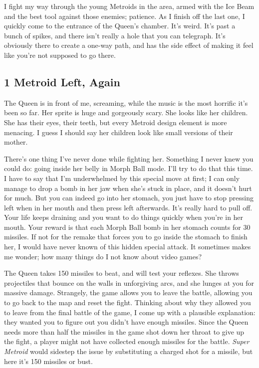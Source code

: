 \documentclass{book}
\begin{document}
I fight my way through the young Metroids in the area, armed with the Ice Beam and the best tool against those enemies; patience. As I finish off the last one, I quickly come to the entrance of the Queen’s chamber. It’s weird. It’s past a bunch of spikes, and there isn’t really a hole that you can telegraph. It’s obviously there to create a one-way path, and has the side effect of making it feel like you’re not supposed to go there.

\subsection*{1 Metroid Left, Again}\nopagebreak[4]

The Queen is in front of me, screaming, while the music is the most horrific it’s been so far. Her sprite is huge and gorgeously scary. She looks like her children. She has their eyes, their teeth, but every Metroid design element is more menacing. I guess I should say her children look like small versions of their mother.

There’s one thing I’ve never done while fighting her. Something I never knew you could do: going inside her belly in Morph Ball mode. I’ll try to do that this time. I have to say that I’m underwhelmed by this special move at first; I can only manage to drop a bomb in her jaw when she’s stuck in place, and it doesn’t hurt for much. But you can indeed go into her stomach, you just have to stop pressing left when in her mouth and then press left afterwards. It’s really hard to pull off. Your life keeps draining and you want to do things quickly when you’re in her mouth. Your reward is that each Morph Ball bomb in her stomach counts for 30 missiles. If not for the remake that forces you to go inside the stomach to finish her, I would have never known of this hidden special attack. It sometimes makes me wonder; how many things do I not know about video games?

The Queen takes 150 missiles to beat, and will test your reflexes. She throws projectiles that bounce on the walls in unforgiving arcs, and she lunges at you for massive damage. Strangely, the game allows you to leave the battle, allowing you to go back to the map and reset the fight. Thinking about why they allowed you to leave from the final battle of the game, I come up with a plausible explanation: they wanted you to figure out you didn’t have enough missiles. Since the Queen needs more than half the missiles in the game shot down her throat to give up the fight, a player might not have collected enough missiles for the battle. \emph{Super Metroid} would sidestep the issue by substituting a charged shot for a missile, but here it’s 150 missiles or bust.
\end{document}
